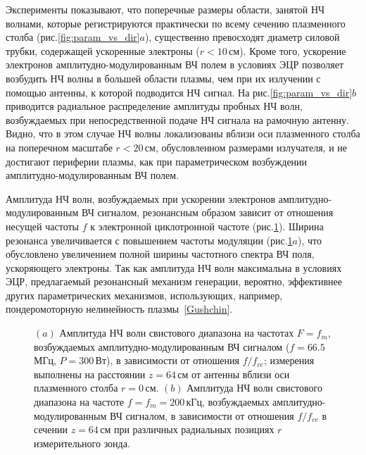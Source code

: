 \documentclass[autoref,10pt]{disser}
\begin{document}
Эксперименты показывают, что поперечные размеры области, занятой НЧ волнами, которые регистрируются практически по всему сечению плазменного столба (\mbox{рис.\ref{fig:param_vs_dir}$a$}), существенно превосходят диаметр силовой трубки, содержащей ускоренные электроны ($r < 10$\,см). Кроме того, ускорение электронов амплитудно-мо\-ду\-ли\-ро\-ван\-ным ВЧ полем в условиях ЭЦР позволяет возбудить НЧ волны в большей области плазмы, чем при их излучении с помощью антенны, к которой подводится НЧ сигнал. На \mbox{рис.\ref{fig:param_vs_dir}$b$} приводится радиальное распределение амплитуды пробных НЧ волн, возбуждаемых при непосредственной подаче НЧ сигнала на рамочную антенну. Видно, что в этом случае НЧ волны локализованы вблизи оси плазменного столба на поперечном масштабе $r < 20$\,см, обусловленном размерами излучателя, и не достигают периферии плазмы, как при параметрическом возбуждении амплитудно-модулированным ВЧ полем.   

Амплитуда НЧ волн, возбуждаемых при ускорении электронов ам\-пли\-ту\-дно-мо\-ду\-ли\-ро\-ван\-ным ВЧ сигналом, резонансным образом зависит от отношения несущей частоты $f$ к электронной циклотронной частоте (\mbox{рис.\ref{fig:param_vs_dir_res}}). Ширина резонанса увеличивается с повышением частоты модуляции (\mbox{рис.\ref{fig:param_vs_dir_res}$a$}), что обусловлено увеличением полной ширины частотного спектра ВЧ поля, ускоряющего электроны. Так как амплитуда НЧ волн максимальна в условиях ЭЦР, предлагаемый резонансный механизм генерации, вероятно, эффективнее других параметрических механизмов, использующих, например, пондеромоторную нелинейность плазмы~\ref{Gushchin}.
\begin{figure}[H]
  \centering
  \def\svgwidth{0.6\columnwidth} %
  
  \vspace{0.3cm}
  \caption{$(a)$ Амплитуда НЧ волн свистового диапазона на частотах $F=f_m$, возбуждаемых амплитудно-модулированным ВЧ сигналом ($f=66.5$\,МГц, $P=300$\,Вт), в зависимости от отношения $f/f_{ce}$; измерения выполнены на расстоянии $z=64$\,см от антенны вблизи оси плазменного столба $r=0$\,см. $(b)$ Амплитуда НЧ волн свистового диапазона на частоте $f=f_m=200$\,кГц, возбуждаемых амплитудно-модулированным ВЧ сигналом, в зависимости от отношения $f/f_{ce}$ в сечении $z=64$\,см при различных радиальных позициях $r$ измерительного зонда.}
  \label{fig:param_vs_dir_res}
\end{figure}
\end{document}
